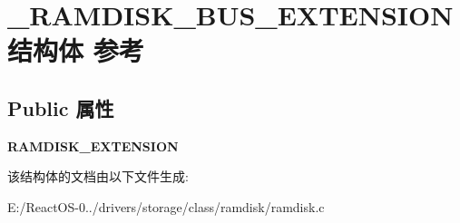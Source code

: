 \hypertarget{struct___r_a_m_d_i_s_k___b_u_s___e_x_t_e_n_s_i_o_n}{}\section{\+\_\+\+R\+A\+M\+D\+I\+S\+K\+\_\+\+B\+U\+S\+\_\+\+E\+X\+T\+E\+N\+S\+I\+O\+N结构体 参考}
\label{struct___r_a_m_d_i_s_k___b_u_s___e_x_t_e_n_s_i_o_n}
\subsection*{Public 属性}
\begin{DoxyCompactItemize}
\item 
\mbox{\label{struct___r_a_m_d_i_s_k___b_u_s___e_x_t_e_n_s_i_o_n_a0e3773dc88140f9438b2b1b2ac8f8719}} 
{\bfseries R\+A\+M\+D\+I\+S\+K\+\_\+\+E\+X\+T\+E\+N\+S\+I\+ON}
\end{DoxyCompactItemize}


该结构体的文档由以下文件生成\+:\begin{DoxyCompactItemize}
\item 
E\+:/\+React\+O\+S-\/0../drivers/storage/class/ramdisk/ramdisk.\+c\end{DoxyCompactItemize}
